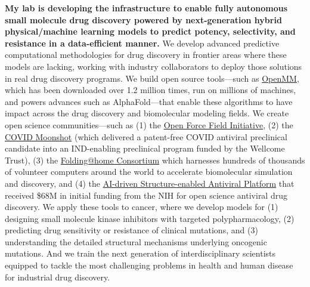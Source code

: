 \documentclass[10pt]{article}
\begin{document}

\textbf{My lab is developing the infrastructure to enable fully autonomous small molecule drug discovery powered by next-generation hybrid physical/machine learning models to predict potency, selectivity, and resistance in a data-efficient manner.}
We develop advanced predictive computational methodologies for drug discovery in frontier areas where these models are lacking, working with industry collaborators to deploy those solutions in real drug discovery programs.
We build open source tools---such as \href{http://openmm.org}{OpenMM}, which has been downloaded over 1.2 million times, run on millions of machines, and powers advances such as AlphaFold---that enable these algorithms to have impact across the drug discovery and biomolecular modeling fields.
We create open science communities---such as (1) the \href{http://openforcefield.org}{Open Force Field Initiative}, (2) the \href{http://postera.ai/covid}{COVID Moonshot} (which delivered a patent-free COVID antiviral preclinical candidate into an IND-enabling preclinical program funded by the Wellcome Trust), (3) the \href{https://foldingathome.org/about-2/the-foldinghome-consortium/?lng=en}{Folding@home Consortium} which harnesses hundreds of thousands of volunteer computers around the world to accelerate biomolecular simulation and discovery, and (4) the \href{http://asapdiscovery.org}{AI-driven Structure-enabled Antiviral Platform} that received \$68M in initial funding from the NIH for open science antiviral drug discovery.
We apply these tools to cancer, where we develop models for (1) designing small molecule kinase inhibitors with targeted polypharmacology, (2) predicting drug sensitivity or resistance of clinical mutations, and (3) understanding the detailed structural mechanisms underlying oncogenic mutations.
And we train the next generation of interdisciplinary scientists equipped to tackle the most challenging problems in health and human disease for industrial drug discovery.
\end{document}
